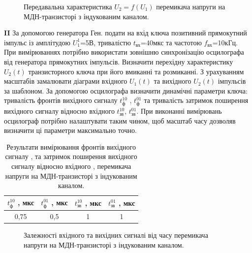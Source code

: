 \documentclass[a4paper,14pt]{extreport}
\begin{document}
 
\begin{figure}[h!]
	\caption{Передавальна характеристика $U_2 = f(U_1)$ перемикача напруги на МДН-транзисторі з індукованим каналом.}
	\label{ris3}
\end{figure}

\textbf{II} За допомогою генератора Ген. подати на вхід ключа позитивний прямокутний імпульс із амплітудою $U_1^1$=5В, тривалістю $t_{\text{вх}}$=40мкс та частотою $f_{\text{вх}}$=10кГц.
При вимірюваннях потрібно використати зовнішню синхронізацію осцилографа від генератора прямокутних імпульсів.
Визначити перехідну характеристику $U_2(t)$ транзисторного ключа при його вмиканні та розмиканні. З урахуванням масштабів замалювати діаграми вхідного $U_1(t)$  та вихідного $U_2(t)$  імпульсів за шаблоном. За допомогою осцилографа визначити динамічні параметри ключа: тривалість фронтів вихідного сигналу $t_{\text{ф}}^{10}$ , $t_{\text{ф}}^{01}$ та тривалість затримок поширення вихідного сигналу відносно вхідного $t_{\text{зв}}^{10}$, $t_{\text{зв}}^{01}$. При виконанні вимірювань осцилограф потрібно налаштувати таким чином, щоб масштаб часу дозволяв визначити ці параметри максимально точно.

\begin{table}[h]
	\begin{center}
		\begin{tabular}{|c|c|c|c|}
			\hline
			 $t_{\text{ф}}^{10}$ , мкс& $t_{\text{ф}}^{01}$ , мкс &$t_{\text{зв}}^{10}$ , мкс  & $t_{\text{зв}}^{01}$ , мкс \\ \hline
			 0,75& 0,5 &  1& 1 \\ \hline
		\end{tabular}
		\caption{Результати вимірювання фронтів вихідного сигналу ,  та затримок поширення вихідного сигналу відносно вхідного ,  перемикача напруги на МДН-транзисторі з індукованим каналом.}
		\label{tab4}
	\end{center}
\end{table}





\begin{figure}[h!]
	\caption{Залежності вхідного та вихідних сигналі від часу перемикача напруги на МДН-транзисторі з 
	індукованим каналом.}
	\label{ris3}
\end{figure}
\end{document}
